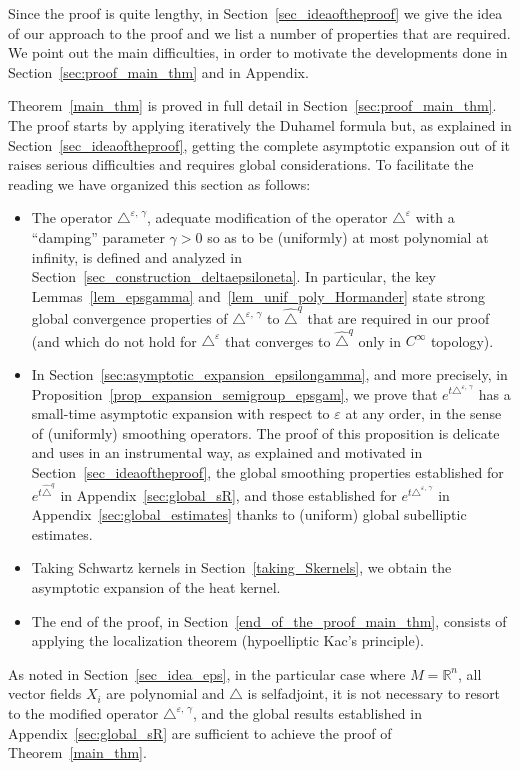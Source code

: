 \documentclass[10pt]{amsart}
\theoremstyle{definition}\newtheorem{defi}[theo]{Definition}\newtheorem{rema}[theo]{Remark}\newtheorem{exam}[theo]{Example}\newtheorem{exem}[theo]{Example}\newtheorem{nota}[theo]{Notation}
\newcommand*\R{\mathbb{R}}
\begin{document}
Since the proof is quite lengthy, in Section~\ref{sec_ideaoftheproof} we give the idea of our approach to the proof and we list a number of properties that are required. We point out the main difficulties, in order to motivate the developments done in Section~\ref{sec:proof_main_thm} and in Appendix.

Theorem~\ref{main_thm} is proved in full detail in Section~\ref{sec:proof_main_thm}. The proof starts by applying iteratively the Duhamel formula but, as explained in Section~\ref{sec_ideaoftheproof}, getting the complete asymptotic expansion out of it raises serious difficulties and requires global considerations. To facilitate the reading we have organized this section as follows:
\begin{itemize}
\item The operator $\triangle^{\varepsilon,\,\gamma}$, adequate modification of the operator $\triangle^\varepsilon$ with a ``dam\-ping'' parameter $\gamma>0$ so as to be (uniformly) at most polynomial at infinity, is defined and analyzed in Section~\ref{sec_construction_deltaepsiloneta}. In particular, the key Lemmas~\ref{lem_epsgamma} and~\ref{lem_unif_poly_Hormander} state strong global convergence properties of $\triangle^{\varepsilon,\,\gamma}$ to $\widehat{\triangle}^{q}$ that are required in our proof (and which do not hold for $\triangle^\varepsilon$ that converges to $\widehat{\triangle}^{q}$ only in $C^\infty$ topology).
\item In Section~\ref{sec:asymptotic_expansion_epsilongamma}, and more precisely, in Proposition~\ref{prop_expansion_semigroup_epsgam}, we prove that $e^{t\triangle^{\varepsilon,\,\gamma}}$ has a small-time asymptotic expansion with respect to $\varepsilon$ at any order, in the sense of (uniformly) smoothing operators. The proof of this proposition is delicate and uses in an instrumental way, as explained and motivated in Section~\ref{sec_ideaoftheproof}, the global smoothing properties established for $e^{t\widehat{\triangle}^{q}}$ in Appendix~\ref{sec:global_sR}, and those established for $e^{t\triangle^{\varepsilon,\,\gamma}}$ in Appendix~\ref{sec:global_estimates} thanks to (uniform) global subelliptic estimates.
\item Taking Schwartz kernels in Section~\ref{taking_Skernels}, we obtain the asymptotic expansion of the heat kernel.
\item The end of the proof, in Section~\ref{end_of_the_proof_main_thm}, consists of applying the localization theorem (hypoelliptic Kac's principle).
\end{itemize}
As noted in Section~\ref{sec_idea_eps}, in the particular case where $M=\R^n$, all vector fields $X_i$ are polynomial and $\triangle$ is selfadjoint, it is not necessary to resort to the modified operator $\triangle^{\varepsilon,\,\gamma}$, and the global results established in Appendix~\ref{sec:global_sR} are sufficient to achieve the proof of Theorem~\ref{main_thm}.
\end{document}
